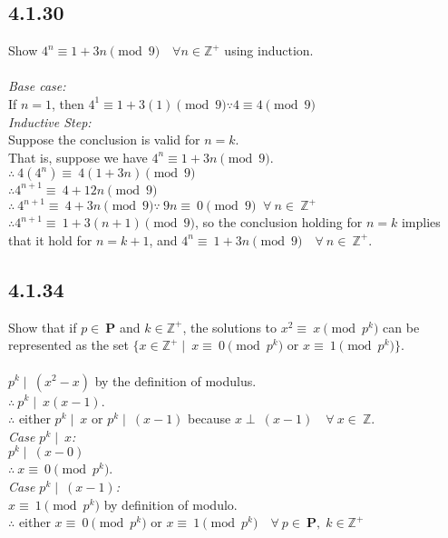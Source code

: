 \documentclass{article}
\begin{document}
\subsection{4.1.30}
Show $4^n \equiv 1+3n \pmod{9} \quad \forall n \in \mathbb{Z}^+$ using induction.
\\
\\\emph{Base case:}
\\If $n=1$, then $4^1 \equiv 1+3(1) \pmod{9} \because 4 \equiv 4 \pmod{9}$
\\\emph{Inductive Step:}
\\Suppose the conclusion is valid for $n=k$.
\\That is, suppose we have $4^n \equiv 1+3n \pmod{9}$.
\\$\therefore\ 4(4^n) \equiv\ 4(1+3n) \pmod{9}$
\\$\therefore 4^{n+1} \equiv\ 4+12n \pmod{9}$
\\$\therefore\ 4^{n+1} \equiv\ 4+3n \pmod{9} \because\ 9n \equiv\ 0 \pmod{9} \;\; \forall\ n \in\ \mathbb{Z}^+$
\\$\therefore 4^{n+1} \equiv\ 1+3(n+1) \pmod{9}$, so the conclusion holding for $n=k$ implies that it hold for $n=k+1$, and $4^n \equiv\ 1+3n \pmod{9} \quad \forall\ n \in\ \mathbb{Z}^+$.

\subsection{4.1.34}
Show that if $p \in\! \ \textbf{P}$ and $k \in\! \mathbb{Z}^+$, the solutions to $x^2 \equiv\ x \pmod{p^k}$ can be represented as the set $\{x \in\! \mathbb{Z}^+ \mid\ x \equiv\ 0 \pmod{p^k}$ or $x \equiv\ 1 \pmod{p^k}\}$.
\\
\\$p^k \mid\ (x^2-x)$ by the definition of modulus.
\\$\therefore\ p^k \mid\ x(x-1)$.
\\$\therefore$ either $p^k \mid\ x$ or $p^k \mid\ (x-1)$ because $x \perp\ (x-1) \quad \forall\ x \in\ \mathbb{Z}$.
\\\emph{Case $p^k \mid\ x$:}
\\$p^k \mid\ (x - 0)$
\\$\therefore\ x \equiv\ 0 \pmod{p^k}$.
\\\emph{Case $p^k \mid\ (x-1)$:}
\\$x \equiv\ 1 \pmod{p^k}$ by definition of modulo.
\\$\therefore$ either $x \equiv\ 0 \pmod{p^k}$ or $x \equiv\ 1 \pmod{p^k} \quad \forall\ p \in\! \ \textbf{P}, \; k \in\! \mathbb{Z}^+$
\end{document}
